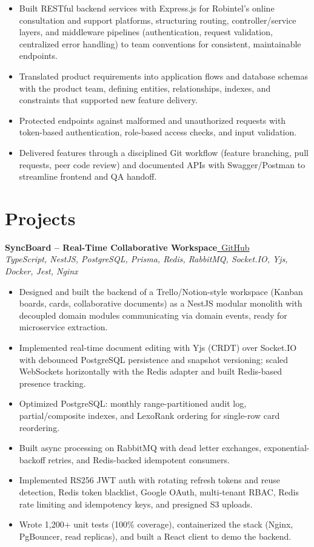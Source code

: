 \documentclass[a4paper,10pt]{article}
\newcommand{\projectheader}[3]{%
  \noindent\textbf{#1}\hfill\href{#2}{\small\faGithub\ \color{linkblue}GitHub}\\[-2pt]
  {\small\color{medgray}\textit{#3}}
  \vspace{2pt}
}
\begin{document}
\begin{itemize}
  \item Built RESTful backend services with Express.js for Robintel's online consultation and support platforms, structuring routing, controller/service layers, and middleware pipelines (authentication, request validation, centralized error handling) to team conventions for consistent, maintainable endpoints.
  \item Translated product requirements into application flows and database schemas with the product team, defining entities, relationships, indexes, and constraints that supported new feature delivery.
  \item Protected endpoints against malformed and unauthorized requests with token-based authentication, role-based access checks, and input validation.
  \item Delivered features through a disciplined Git workflow (feature branching, pull requests, peer code review) and documented APIs with Swagger/Postman to streamline frontend and QA handoff.
\end{itemize}

\newpage

\section{Projects}

\projectheader
  {SyncBoard -- Real-Time Collaborative Workspace}
  {https://github.com/1mimhe/sync-board}
  {TypeScript, NestJS, PostgreSQL, Prisma, Redis, RabbitMQ, Socket.IO, Yjs, Docker, Jest, Nginx}

\begin{itemize}
  \item Designed and built the backend of a Trello/Notion-style workspace (Kanban boards, cards, collaborative documents) as a NestJS modular monolith with decoupled domain modules communicating via domain events, ready for microservice extraction.
  \item Implemented real-time document editing with Yjs (CRDT) over Socket.IO with debounced PostgreSQL persistence and snapshot versioning; scaled WebSockets horizontally with the Redis adapter and built Redis-based presence tracking.
  \item Optimized PostgreSQL: monthly range-partitioned audit log, partial/composite indexes, and LexoRank ordering for single-row card reordering.
  \item Built async processing on RabbitMQ with dead letter exchanges, exponential-backoff retries, and Redis-backed idempotent consumers.
  \item Implemented RS256 JWT auth with rotating refresh tokens and reuse detection, Redis token blacklist, Google OAuth, multi-tenant RBAC, Redis rate limiting and idempotency keys, and presigned S3 uploads.
  \item Wrote 1,200+ unit tests (100\% coverage), containerized the stack (Nginx, PgBouncer, read replicas), and built a React client to demo the backend.
\end{itemize}
\end{document}
